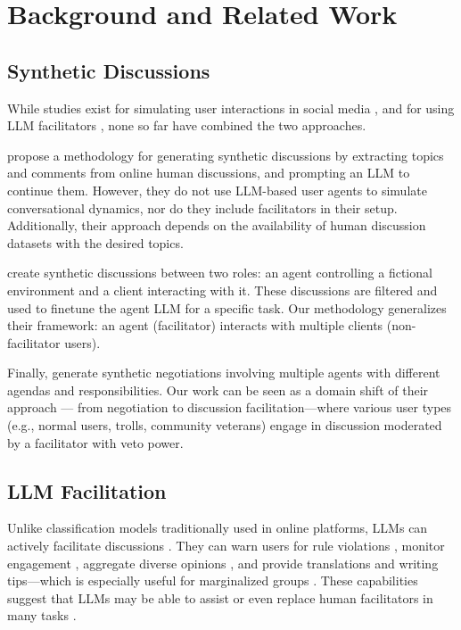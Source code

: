 %
\section{Background and Related Work}

\subsection{Synthetic Discussions}
\label{ssec:related:discussions}

While studies exist for simulating user interactions in social media \cite{park_simulacra, mou_2024, tornberg_2023, y_social, balog_2024}, and for using LLM facilitators \cite{kim_et_al_chatbot, cho-etal-2024-language}, none so far have combined the two approaches. 

\citet{balog_2024} propose a methodology for generating synthetic discussions by extracting topics and comments from online human discussions, and prompting an LLM to continue them. However, they do not use LLM-based user agents to simulate conversational dynamics, nor do they include facilitators in their setup. Additionally, their approach depends on the availability of human discussion datasets with the desired topics.

\citet{ulmer2024} create synthetic discussions between two roles: an agent controlling a fictional environment and a client interacting with it. These discussions are filtered and used to finetune the agent LLM for a specific task. Our methodology generalizes their framework: an agent (facilitator) interacts with multiple clients (non-facilitator users).

Finally, \citet{abdelnabi_negotiations} generate synthetic negotiations involving multiple agents with different agendas and responsibilities. Our work can be seen as a domain shift of their approach --- from negotiation to discussion facilitation---where various user types (e.g., normal users, trolls, community veterans) engage in discussion moderated by a facilitator with veto power.


\subsection{LLM Facilitation}

Unlike classification models traditionally used in online platforms, LLMs can actively facilitate discussions \cite{korre2025evaluation}. They can warn users for rule violations \cite{Kumar_AbuHashem_Durumeric_2024}, monitor engagement \cite{schroeder-etal-2024-fora}, aggregate diverse opinions \cite{small-polis-llm}, and provide translations and writing tips---which is especially useful for marginalized groups \cite{Tsai2024Generative}. These capabilities suggest that LLMs may be able to assist or even replace human facilitators in many tasks \cite{small-polis-llm, seering_self_moderation}.

